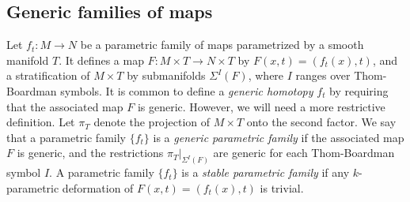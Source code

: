 \documentclass[12pt]{amsart}
\def \R{\mathbb{R}}
\def\co{\colon}
\theoremstyle{definition}
\newtheorem{definition}[theorem]{Definition}
\begin{document}
\fi

\subsection{Generic families of maps}\label{s:2.3}
Let $f_t\co M\to N$ be a parametric family of maps parametrized by a smooth manifold $T$. It defines a map $F\co M\times T\to N\times T$ by $F(x, t)=(f_t(x), t)$, and a stratification of $M\times T$ by submanifolds $\Sigma^I(F)$, where $I$ ranges over Thom-Boardman symbols. It is common to define a \emph{generic homotopy} $f_t$ by requiring that the associated map $F$ is generic. However, we will need a more restrictive definition. 
Let $\pi_T$ denote the projection of $M\times T$ onto the second factor. 
We say that a parametric family $\{f_t\}$ is a \emph{generic parametric family} if the associated map $F$ is generic, and the restrictions $\pi_T|_{\Sigma^I(F)}$ are generic for each Thom-Boardman symbol $I$. A parametric family $\{f_t\}$ is a \emph{stable parametric family} if any $k$-parametric deformation of $F(x, t)=(f_t(x), t)$ is trivial. 
\end{document}
